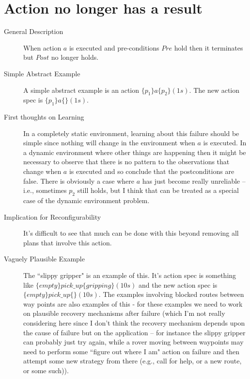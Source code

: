 \documentclass{blue-book}
\newcommand{\actionspec}[4]{\ensuremath{\{#1\}#2\{#3\}(#4)}}
\begin{document}
\section{Action no longer has a result}
\label{sec:no_result}
\begin{description}
\item[General Description] When action $a$ is executed and pre-conditions $Pre$ hold then it terminates but $Post$ no longer holds.

\item[Simple Abstract Example] A simple abstract example is an action \actionspec{p_1}{a}{p_2}{1s}.  The new action spec is \actionspec{p_1}{a}{}{1s}.

\item[First thoughts on Learning] In a completely static environment, learning about this failure should be simple since nothing will change in the environment when $a$ is executed.  In a dynamic environment where other things are happening then it might be necessary to observe that there is no pattern to the observations that change when $a$ is executed and so conclude that the postconditions are false.  There is obviously a case where $a$ has just become really unreliable -- i.e., sometimes $p_2$ still holds, but I think that can be treated as a special case of the dynamic environment problem.

\item[Implication for Reconfigurability]  It's difficult to see that much can be done with this beyond removing all plans that involve this action.

\item[Vaguely Plausible Example] The ``slippy gripper" is an example of this.  It's action spec is something like \actionspec{empty}{pick\_up}{gripping}{10s} and the new action spec is \actionspec{empty}{pick\_up}{}{10s}.  The examples involving blocked routes between way points are also examples of this - for these examples we need to work on plausible recovery mechanisms after failure (which I'm not really considering here since I don't think the recovery mechanism depends upon the cause of failure but on the application -- for instance the slippy gripper can probably just try again, while a rover moving between waypoints may need to perform some ``figure out where I am" action on failure and then attempt some new strategy from there (e.g., call for help, or a new route, or some such)).
\end{description}
\end{document}
